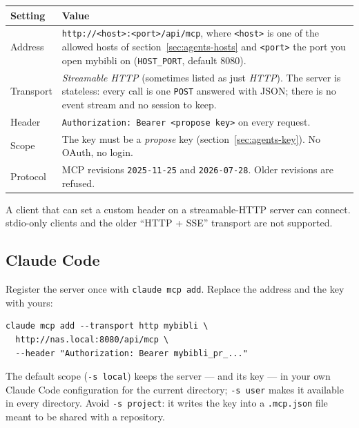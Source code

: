 \begin{center}\small
\begin{tabular}{@{} l >{\raggedright\arraybackslash}p{9.5cm} @{}}
\toprule
\textbf{Setting} & \textbf{Value} \\
\midrule
Address   & \texttt{http://<host>:<port>/api/mcp}, where
            \texttt{<host>} is one of the allowed hosts of
            section~\ref{sec:agents-hosts} and \texttt{<port>} the
            port you open mybibli on (\texttt{HOST\_PORT}, default
            8080). \\
Transport & \emph{Streamable HTTP} (sometimes listed as just
            \emph{HTTP}). The server is stateless: every call is one
            \texttt{POST} answered with JSON; there is no event
            stream and no session to keep. \\
Header    & \texttt{Authorization: Bearer <propose key>} on every
            request. \\
Scope     & The key must be a \emph{propose} key
            (section~\ref{sec:agents-key}). No OAuth, no login. \\
Protocol  & MCP revisions \texttt{2025-11-25} and
            \texttt{2026-07-28}. Older revisions are refused. \\
\bottomrule
\end{tabular}
\end{center}

A client that can set a custom header on a streamable-HTTP server can
connect. stdio-only clients and the older ``HTTP + SSE'' transport are
not supported.

\subsection{Claude Code}
\label{sec:agents-claude-code}

Register the server once with \texttt{claude mcp add}. Replace the
address and the key with yours:

\begin{lstlisting}
claude mcp add --transport http mybibli \
  http://nas.local:8080/api/mcp \
  --header "Authorization: Bearer mybibli_pr_..."
\end{lstlisting}

The default scope (\texttt{-s local}) keeps the server --- and its
key --- in your own Claude Code configuration for the current
directory; \texttt{-s user} makes it available in every directory.
Avoid \texttt{-s project}: it writes the key into a
\texttt{.mcp.json} file meant to be shared with a repository.

